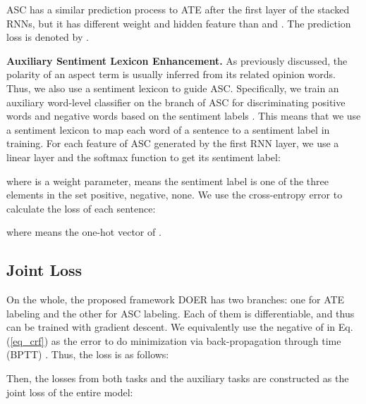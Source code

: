 \documentclass[11pt,a4paper]{article}
\begin{document}
	ASC has a similar prediction process to ATE after the first layer of the stacked RNNs, but it has different weight  and hidden feature  than  and . The prediction loss is denoted by .

    \vspace{+1.5mm}
	\noindent
	\textbf{Auxiliary Sentiment Lexicon Enhancement.} \quad As previously discussed, the polarity of an aspect term is usually inferred from its related opinion words. Thus, we also use a sentiment lexicon to guide ASC. Specifically, we train an auxiliary word-level classifier on the branch of ASC for discriminating positive words and negative words based on the sentiment labels . This means that we use a sentiment lexicon to map each word of a sentence to a sentiment label in training. For each feature of ASC  generated by the first RNN layer, we use a linear layer and the softmax function to get its sentiment label:
	
	where  is a weight parameter,  means the sentiment label is one of the three elements in the set positive, negative, none. We use the cross-entropy error to calculate the loss of each sentence:
	
	where  means the one-hot vector of .

	\subsection{Joint Loss}
	\label{sec_training}
	On the whole, the proposed framework DOER has two branches: one for ATE labeling and the other for ASC labeling. Each of them is differentiable, and thus can be trained with gradient descent. We equivalently use the negative of  in Eq. (\ref{eq_crf}) as the error to do minimization via back-propagation through time (BPTT) \cite{Goller1996}. Thus, the loss is as follows:
	
	Then, the losses from both tasks and the auxiliary tasks are constructed as the joint loss of the entire model:
	
\end{document}
